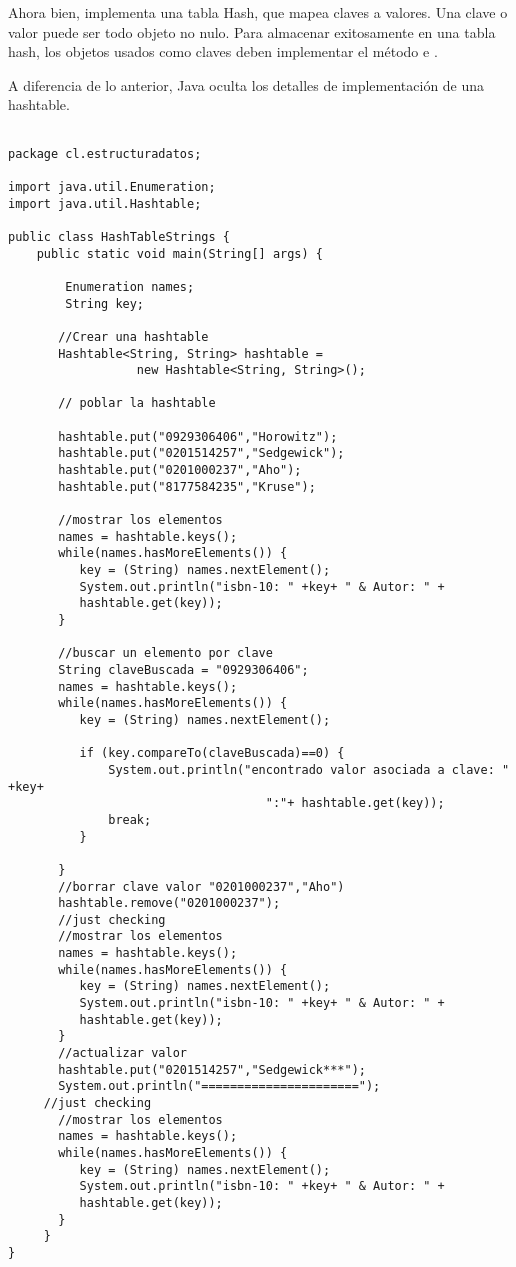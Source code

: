 Ahora bien,  implementa una tabla Hash, que mapea claves a valores. Una clave o valor puede ser todo objeto no nulo.
Para almacenar exitosamente en una tabla hash, los objetos usados como claves deben implementar el método  e .


A diferencia de lo anterior, Java oculta los detalles de implementación de una hashtable. 
\begin{lstlisting}

package cl.estructuradatos;

import java.util.Enumeration;
import java.util.Hashtable;

public class HashTableStrings {
	public static void main(String[] args) {
		 
		Enumeration names;
		String key;
	 
	   //Crear una hashtable
	   Hashtable<String, String> hashtable = 
	              new Hashtable<String, String>();
	 
	   // poblar la hashtable
	   
	   hashtable.put("0929306406","Horowitz");
	   hashtable.put("0201514257","Sedgewick");
	   hashtable.put("0201000237","Aho");
	   hashtable.put("8177584235","Kruse");
	 
	   //mostrar los elementos
	   names = hashtable.keys();
	   while(names.hasMoreElements()) {
	      key = (String) names.nextElement();
	      System.out.println("isbn-10: " +key+ " & Autor: " +
	      hashtable.get(key));
	   }
	   
	   //buscar un elemento por clave
	   String claveBuscada = "0929306406";
	   names = hashtable.keys();
	   while(names.hasMoreElements()) {
	      key = (String) names.nextElement();
	      
	      if (key.compareTo(claveBuscada)==0) {
	    	  System.out.println("encontrado valor asociada a clave: " +key+ 
                                    ":"+ hashtable.get(key));
	    	  break;
	      }
	      
	   }
	   //borrar clave valor "0201000237","Aho")
	   hashtable.remove("0201000237");
	   //just checking 
	   //mostrar los elementos
	   names = hashtable.keys();
	   while(names.hasMoreElements()) {
	      key = (String) names.nextElement();
	      System.out.println("isbn-10: " +key+ " & Autor: " +
	      hashtable.get(key));
	   }
	   //actualizar valor
	   hashtable.put("0201514257","Sedgewick***");
	   System.out.println("======================");
	 //just checking 
	   //mostrar los elementos
	   names = hashtable.keys();
	   while(names.hasMoreElements()) {
	      key = (String) names.nextElement();
	      System.out.println("isbn-10: " +key+ " & Autor: " +
	      hashtable.get(key));
	   }
	 }
}
\end{lstlisting}

